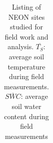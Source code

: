 \documentclass[
  letterpaper,
  DIV=11,
  numbers=noendperiod]{scrartcl}
\begin{document}
\scriptsize

\begin{longtable}[]{@{}
  >{\raggedright\arraybackslash}p{}
  >{\raggedright\arraybackslash}p{}
  >{\raggedright\arraybackslash}p{}
  >{\raggedright\arraybackslash}p{}
  >{\raggedright\arraybackslash}p{}
  >{\raggedright\arraybackslash}p{}
  >{\raggedright\arraybackslash}p{}@{}}

\caption{\label{tbl-neon-sites}Listing of NEON sites studied for field
work and analysis. \(\overline{T_{S}}\): average soil temperature during
field measurements. \(\overline{SWC}\): average soil water content
during field measurements}

\tabularnewline


\end{longtable}
\end{document}
